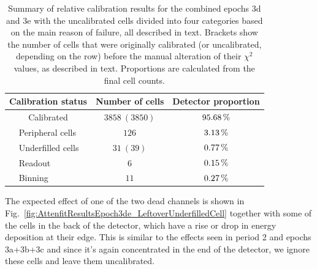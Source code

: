\begin{table}[!hbtp]
\centering
\caption[Summary of relative calibration results for the combined epochs 3d and 3e]{Summary of relative calibration results for the combined epochs 3d and 3e with the uncalibrated cells divided into four categories based on the main reason of failure, all described in text. Brackets show the number of cells that were originally calibrated (or uncalibrated, depending on the row) before the manual alteration of their $\chi^2$ values, as described in text. Proportions are calculated from the final cell counts.}
\def\arraystretch{1.4}
\begin{tabular}{|cl|c|c|}
\hline
\multicolumn{2}{|c|}{\textbf{Calibration status}} & \textbf{Number of cells} & \textbf{Detector proportion}\\\hline
\multicolumn{2}{|c|}{Calibrated} & $3858\ (3850)$ & $\unit[95.68]{\%}$\\\hline
\parbox[t]{2mm}{} & Peripheral cells & $126$ & $\unit[3.13]{\%}$\\
 & Underfilled cells & $31\ (39)$ & $\unit[0.77]{\%}$\\
 & Readout & $6$ & $\unit[0.15]{\%}$\\
 & Binning & $11$ & $\unit[0.27]{\%}$\\\hline
\end{tabular}
\label{tab:TestBeamEp3deRelCalibResults}
\end{table}

The expected effect of one of the two dead channels is shown in Fig.~\ref{fig:AttenfitResultsEpoch3de_LeftoverUnderfilledCell} together with some of the cells in the back of the detector, which have a rise or drop in energy deposition at their edge. This is similar to the effects seen in period 2 and epochs 3a+3b+3c and since it's again concentrated in the end of the detector, we ignore these cells and leave them uncalibrated.

